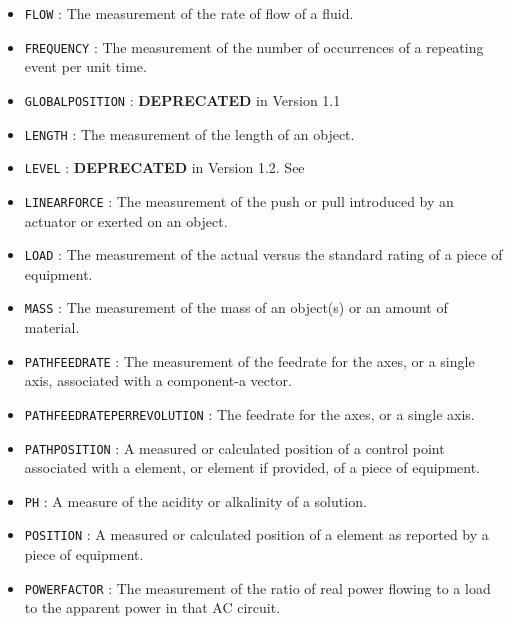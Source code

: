 \begin{itemize}
\item \texttt{FLOW} : The measurement of the rate of flow of a fluid. 

\item \texttt{FREQUENCY} : The measurement of the number of occurrences of a repeating event per unit time. 

\item \texttt{GLOBAL\textunderscore POSITION} : \textbf{DEPRECATED} in Version 1.1 

\item \texttt{LENGTH} : The measurement of the length of an object. 

\item \texttt{LEVEL} : \textbf{DEPRECATED} in Version 1.2.  See  

\item \texttt{LINEAR\textunderscore FORCE} : The measurement of the push or pull introduced by an actuator or exerted on an object. 

\item \texttt{LOAD} : The measurement of the actual versus the standard rating of a piece of equipment. 

\item \texttt{MASS} : The measurement of the mass of an object(s) or an amount of material. 

\item \texttt{PATH\textunderscore FEEDRATE} : The measurement of the feedrate for the axes, or a single axis, associated with a  component-a vector. 

\item \texttt{PATH\textunderscore FEEDRATE\textunderscore PER\textunderscore REVOLUTION} : The feedrate for the axes, or a single axis. 

\item \texttt{PATH\textunderscore POSITION} : A measured or calculated position of a control point associated with a  element, or  element if provided, of a piece of equipment. 

\item \texttt{PH} : A measure of the acidity or alkalinity of a solution. 

\item \texttt{POSITION} : A measured or calculated position of a  element as reported by a piece of equipment. 

\item \texttt{POWER\textunderscore FACTOR} : The measurement of the ratio of real power flowing to a load to the apparent power in that AC circuit. 


\end{itemize}

